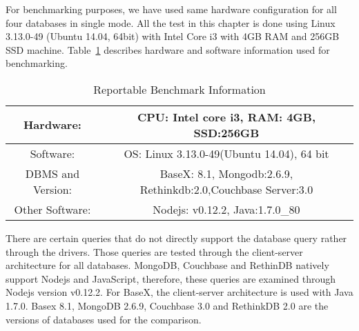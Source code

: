 For benchmarking purposes, we have used same hardware configuration for all four databases in single mode. All the test in this chapter is done using  Linux 3.13.0-49 (Ubuntu 14.04, 64bit) with Intel Core i3 with 4GB RAM and 256GB SSD machine.
Table~\ref{benchmark-configuration-table} describes hardware and software information used for benchmarking. 
\begin{table}[h]	
	\centering
	\caption{Reportable Benchmark Information}
	\begin{tabular}{|c|c|c|c} 
		\hline
		Hardware: & \multicolumn{3}{|c|}{CPU: Intel core i3, RAM: 4GB, SSD:256GB  } \\
		\hline
		Software: & \multicolumn{3}{|c|}{OS: Linux 3.13.0-49(Ubuntu 14.04), 64 bit} \\
		\hline
		DBMS and Version: & \multicolumn{3}{|c|}{ BaseX: 8.1, Mongodb:2.6.9, Rethinkdb:2.0,Couchbase Server:3.0 } \\
		\hline
		Other Software: & \multicolumn{3}{|c|}{Nodejs: v0.12.2, Java:1.7.0\_80 } \\
		\hline
	\end{tabular}	
	\label{benchmark-configuration-table}
\end{table}
There are certain queries that do not directly support the database query rather through the drivers. Those queries are tested through the client-server architecture for all databases. MongoDB, Couchbase and RethinDB natively support Nodejs and JavaScript, therefore, these queries are examined through Nodejs version  v0.12.2. For BaseX, the client-server architecture is used with Java 1.7.0. Basex 8.1, MongoDB 2.6.9, Couchbase 3.0 and RethinkDB 2.0 are the versions of databases used for the comparison. 